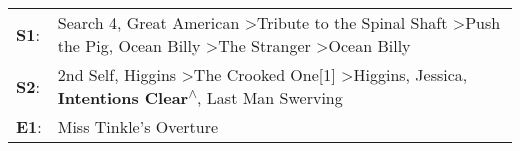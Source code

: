 \begin{supertabular}{p{0.03\textwidth}p{0.92\textwidth}}
 \textbf{S1}:  &  Search 4\textsuperscript{}, \enspace Great American\textsuperscript{} \textgreater \enspace Tribute to the Spinal Shaft\textsuperscript{} \textgreater \enspace Push the Pig\textsuperscript{}, \enspace Ocean Billy\textsuperscript{} \textgreater \enspace The Stranger\textsuperscript{} \textgreater \enspace Ocean Billy\textsuperscript{}  \enspace  \\
 \textbf{S2}:  &                        2nd Self\textsuperscript{}, \enspace Higgins\textsuperscript{} \textgreater \enspace The Crooked One[1]\textsuperscript{} \textgreater \enspace Higgins\textsuperscript{}, \enspace Jessica\textsuperscript{}, \enspace \textbf{Intentions Clear\textsuperscript{$\wedge$}}, \enspace Last Man Swerving\textsuperscript{}  \enspace  \\
 \textbf{E1}:  &                                                                                                                                                                                                                                                                                                         Miss Tinkle's Overture\textsuperscript{}  \enspace  \\
\end{supertabular}
